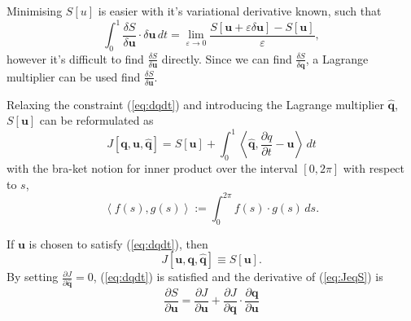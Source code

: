 \documentclass[a4paper, 10pt]{article}
\newcommand{\eq}[1]{(\ref{eq:#1})}
\newcommand{\vect}[1]{\ensuremath{\mathbf{#1}}}
\newcommand{\hvect}[1]{\ensuremath{\hat{\vect{#1}}}}
\newcommand{\pp}[2]{\frac{\partial #1}{\partial #2}}
\newcommand{\vv}[2]{\frac{\delta #1}{\delta #2}}
\newcommand{\eps}{\varepsilon}
\begin{document}
Minimising $S[u]$ is easier with it's variational derivative known, such that
\begin{equation}
  \label{eq:lim_dS}
  \int^1_0 \vv{S}{\vect u}\cdot \delta \vect u\,dt = 
  \lim_{\eps \rightarrow 0} \frac{S[\vect u + \eps \delta \vect u] - S[\vect u]}{\eps},
\end{equation}
 however it's difficult to find $\vv{S}{\vect u}$ directly. Since we can find $\vv{S}{\vect q}$, a Lagrange multiplier can be used find $\vv{S}{\vect u}$.

Relaxing the constraint \eq{dqdt} and introducing the Lagrange multiplier $\hvect q$, $S[\vect u]$ can be reformulated as
\begin{equation}
  \label{eq:J}
  J[\vect q, \vect u, \hvect q] = S[\vect u] + \int^1_0\left\langle \hvect q ,\pp{q}{t} - \vect u\right\rangle \,dt
\end{equation}
with the bra-ket notion for inner product over the interval $[0,2\pi]$ with respect to $s$,
\begin{equation}
  \left\langle f(s),g(s) \right\rangle := \int^{2\pi}_0 f(s) \cdot g(s)\,ds.
\end{equation}

If $\vect u$ is chosen to satisfy \eq{dqdt}, then
\begin{equation}
  \label{eq:JeqS}
  J[\vect u, \vect q, \hvect q] \equiv S[\vect u].
\end{equation}
By setting $\pp{J}{\hvect q} = 0$, \eq{dqdt} is satisfied and the derivative of \eq{JeqS} is
\begin{equation}
  \label{eq:dSeqdJ}
  \pp{S}{\vect u} =  \pp{J}{\vect u} + \pp{J}{\vect q}\cdot\pp{\vect q}{\vect u}
\end{equation}
\end{document}
